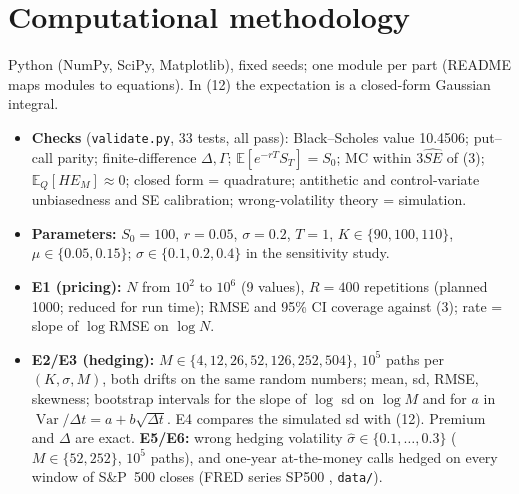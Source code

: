 \documentclass[10pt,a4paper]{article}
\newcommand{\E}{\mathbb{E}}\newcommand{\Var}{\operatorname{Var}}\newcommand{\Cov}{\operatorname{Cov}}
\begin{document}
\section{Computational methodology}
Python (NumPy, SciPy, Matplotlib), fixed seeds; one module per part (README maps modules to equations). In (12) the expectation is a closed-form Gaussian integral.
\begin{itemize}
\item \textbf{Checks} (\texttt{validate.py}, 33 tests, all pass): Black--Scholes value 10.4506; put--call parity; finite-difference $\Delta,\Gamma$; $\E[e^{-rT}S_T]=S_0$; MC within $3\widehat{SE}$ of (3); $\E_Q[HE_M]\approx0$; closed form = quadrature; antithetic and control-variate unbiasedness and SE calibration; wrong-volatility theory = simulation.
\item \textbf{Parameters:} $S_0=100$, $r=0.05$, $\sigma=0.2$, $T=1$, $K\in\{90,100,110\}$, $\mu\in\{0.05,0.15\}$; $\sigma\in\{0.1,0.2,0.4\}$ in the sensitivity study.
\item \textbf{E1 (pricing):} $N$ from $10^2$ to $10^6$ (9 values), $R=400$ repetitions (planned 1000; reduced for run time); RMSE and 95\% CI coverage against (3); rate = slope of $\log$RMSE on $\log N$.
\item \textbf{E2/E3 (hedging):} $M\in\{4,12,26,52,126,252,504\}$, $10^5$ paths per $(K,\sigma,M)$, both drifts on the same random numbers; mean, sd, RMSE, skewness; bootstrap intervals for the slope of $\log$ sd on $\log M$ and for $a$ in $\Var/\Delta t=a+b\sqrt{\Delta t}$. E4 compares the simulated sd with (12). Premium and $\Delta$ are exact. \textbf{E5/E6:} wrong hedging volatility $\hat\sigma\in\{0.1,\dots,0.3\}$ ($M\in\{52,252\}$, $10^5$ paths), and one-year at-the-money calls hedged on every window of S\&P~500 closes (FRED series SP500 \cite{fred}, \texttt{data/}).
\end{itemize}
\end{document}
